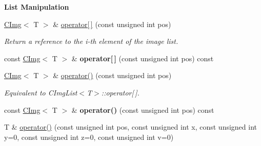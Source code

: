 \begin{Indent}{\bf List Manipulation}\par
\begin{DoxyCompactItemize}
\item 
\hypertarget{structcimg__library_1_1_c_img_list_a8c2ba62382cab9cdf2adcd46206fbdf0}{\hyperlink{structcimg__library_1_1_c_img}{C\-Img}$<$ T $>$ \& \hyperlink{structcimg__library_1_1_c_img_list_a8c2ba62382cab9cdf2adcd46206fbdf0}{operator\mbox{[}$\,$\mbox{]}} (const unsigned int pos)}\label{structcimg__library_1_1_c_img_list_a8c2ba62382cab9cdf2adcd46206fbdf0}

\begin{DoxyCompactList}\small\item\em Return a reference to the i-\/th element of the image list. \end{DoxyCompactList}\item 
\hypertarget{structcimg__library_1_1_c_img_list_a92d8ccdbcc25c9e0f90535f279a7ba77}{const \hyperlink{structcimg__library_1_1_c_img}{C\-Img}$<$ T $>$ \& {\bfseries operator\mbox{[}$\,$\mbox{]}} (const unsigned int pos) const }\label{structcimg__library_1_1_c_img_list_a92d8ccdbcc25c9e0f90535f279a7ba77}

\item 
\hypertarget{structcimg__library_1_1_c_img_list_a93bd324f0a8532e94c78bef4976b7700}{\hyperlink{structcimg__library_1_1_c_img}{C\-Img}$<$ T $>$ \& \hyperlink{structcimg__library_1_1_c_img_list_a93bd324f0a8532e94c78bef4976b7700}{operator()} (const unsigned int pos)}\label{structcimg__library_1_1_c_img_list_a93bd324f0a8532e94c78bef4976b7700}

\begin{DoxyCompactList}\small\item\em Equivalent to C\-Img\-List$<$\-T$>$\-::operator\mbox{[}$\,$\mbox{]}. \end{DoxyCompactList}\item 
\hypertarget{structcimg__library_1_1_c_img_list_ad170096b45d6ea2c254a09bdbafd43d8}{const \hyperlink{structcimg__library_1_1_c_img}{C\-Img}$<$ T $>$ \& {\bfseries operator()} (const unsigned int pos) const }\label{structcimg__library_1_1_c_img_list_ad170096b45d6ea2c254a09bdbafd43d8}

\item 
\hypertarget{structcimg__library_1_1_c_img_list_ad69540f40c53fe98c4232a7f25323ff6}{T \& \hyperlink{structcimg__library_1_1_c_img_list_ad69540f40c53fe98c4232a7f25323ff6}{operator()} (const unsigned int pos, const unsigned int x, const unsigned int y=0, const unsigned int z=0, const unsigned int v=0)}\label{structcimg__library_1_1_c_img_list_ad69540f40c53fe98c4232a7f25323ff6}


\end{DoxyCompactItemize}
\end{Indent}
